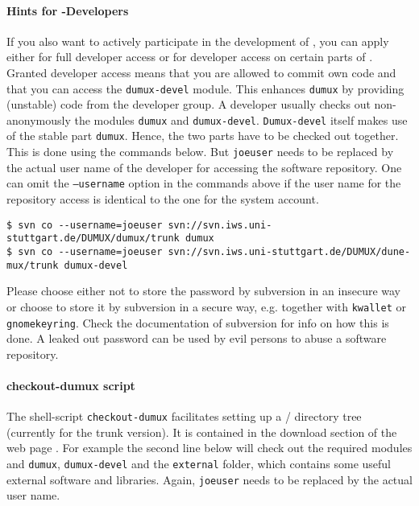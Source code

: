 \paragraph{Hints for \Dumux-Developers}
If you also want to actively participate in the development of \Dumux, you can apply either for full developer
access or for developer access on certain parts of \Dumux. Granted developer access means that
you are allowed to commit own code and that you can access the \texttt{dumux-devel} module.
This enhances \texttt{dumux} by providing (unstable) code from the developer group.
A developer usually checks out non-anonymously the modules \texttt{dumux} and \texttt{dumux-devel}. 
\texttt{Dumux-devel} itself makes use of the stable part \texttt{dumux}. Hence, the two parts have to be checked out together.
This is done using the commands below. But \texttt{joeuser} needs to be replaced by
the actual user name of the developer for accessing the software repository. 
One can omit the \texttt{--username} option in the commands above if the user name for the repository access is
identical to the one for the system account.

\begin{lstlisting}[style=Bash]
$ svn co --username=joeuser svn://svn.iws.uni-stuttgart.de/DUMUX/dumux/trunk dumux
$ svn co --username=joeuser svn://svn.iws.uni-stuttgart.de/DUMUX/dune-mux/trunk dumux-devel
\end{lstlisting}

Please choose either not to store the password by subversion in an insecure way or
choose to store it by subversion in a secure way, e.g. together with \texttt{kwallet} or \texttt{gnomekeyring}.
Check the documentation of subversion for info on how this is done.
A leaked out password can be used by evil persons to abuse a software repository.

\paragraph{checkout-dumux script}
The shell-script \texttt{checkout-dumux} facilitates setting up a {\Dune}/{\Dumux} directory tree (currently for the trunk version).
It is contained in the download section of the \Dumux web page \cite{DUMUX-HP}.
For example the second line below will check out the required \Dune modules and \texttt{dumux}, \texttt{dumux-devel} and the \texttt{external} folder, which contains some useful external software and libraries.
Again,  \texttt{joeuser} needs to be replaced by the actual user name.

